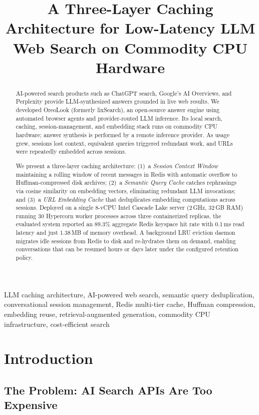 \documentclass[conference]{IEEEtran}
\title{A Three-Layer Caching Architecture for Low-Latency LLM Web Search on Commodity CPU Hardware}
\author{
\IEEEauthorblockN{Ayushman Bhattacharya}
\IEEEauthorblockA{pollinations.ai\\ayushman@pollinations.ai}
\and
\IEEEauthorblockN{Nihal Gazi}
\IEEEauthorblockA{pollinations.ai\\info@nihalgazi.com}
}
\begin{document}
\maketitle


\begin{abstract}
AI-powered search products such as ChatGPT search, Google's AI Overviews, and Perplexity provide LLM-synthesized answers grounded in live web results. We developed OreoLook (formerly lixSearch), an open-source answer engine using automated browser agents and provider-routed LLM inference. Its local search, caching, session-management, and embedding stack runs on commodity CPU hardware; answer synthesis is performed by a remote inference provider. As usage grew, sessions lost context, equivalent queries triggered redundant work, and URLs were repeatedly embedded across sessions.

We present a three-layer caching architecture: (1)~a \emph{Session Context Window} maintaining a rolling window of recent messages in Redis with automatic overflow to Huffman-compressed disk archives; (2)~a \emph{Semantic Query Cache} catches rephrasings via cosine similarity on embedding vectors, eliminating redundant LLM invocations; and (3)~a \emph{URL Embedding Cache} that deduplicates embedding computations across sessions. Deployed on a single 8-vCPU Intel Cascade Lake server (2\,GHz, 32\,GB RAM) running 30 Hypercorn worker processes across three containerized replicas, the evaluated system reported an 89.3\% aggregate Redis keyspace hit rate with 0.1\,ms read latency and just 1.38\,MB of memory overhead. A background LRU eviction daemon migrates idle sessions from Redis to disk and re-hydrates them on demand, enabling conversations that can be resumed hours or days later under the configured retention policy.
\end{abstract}

\begin{IEEEkeywords}
LLM caching architecture, AI-powered web search, semantic query deduplication, conversational session management, Redis multi-tier cache, Huffman compression, embedding reuse, retrieval-augmented generation, commodity CPU infrastructure, cost-efficient search
\end{IEEEkeywords}


\section{Introduction}

\subsection{The Problem: AI Search APIs Are Too Expensive}
\end{document}
